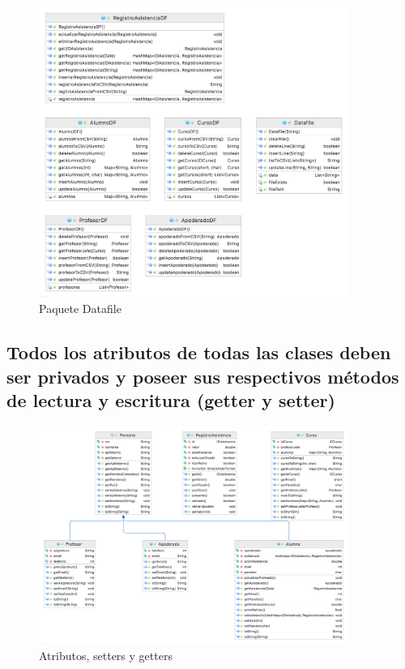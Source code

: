 \begin{figure}[h]
    \centering
    \includegraphics[width=0.9\textwidth]{contents/img/img3}
    \caption{Paquete Datafile}
    \label{fig:img3}
\end{figure}

\clearpage

\subsection{Todos los atributos de todas las clases deben ser privados y poseer sus respectivos métodos de lectura y escritura (getter y setter)}

\begin{figure}[h]
    \centering
    \includegraphics[width=0.9\textwidth]{contents/img/img7}
    \caption{Atributos, setters y getters}
    \label{fig:img7}
\end{figure}

